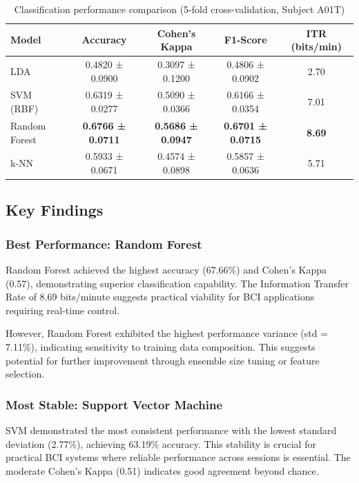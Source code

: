 \documentclass[11pt]{article}
\begin{document}
\begin{table}[H]
\centering
\caption{Classification performance comparison (5-fold cross-validation, Subject A01T)}
\label{tab:performance}
\begin{tabular}{@{}lcccc@{}}
\toprule
\textbf{Model} & \textbf{Accuracy} & \textbf{Cohen's Kappa} & \textbf{F1-Score} & \textbf{ITR (bits/min)} \\
\midrule
LDA & 0.4820 ± 0.0900 & 0.3097 ± 0.1200 & 0.4806 ± 0.0902 & 2.70 \\
SVM (RBF) & 0.6319 ± 0.0277 & 0.5090 ± 0.0366 & 0.6166 ± 0.0354 & 7.01 \\
Random Forest & \textbf{0.6766 ± 0.0711} & \textbf{0.5686 ± 0.0947} & \textbf{0.6701 ± 0.0715} & \textbf{8.69} \\
k-NN & 0.5933 ± 0.0671 & 0.4574 ± 0.0898 & 0.5857 ± 0.0636 & 5.71 \\
\bottomrule
\end{tabular}
\end{table}

\subsection{Key Findings}

\subsubsection{Best Performance: Random Forest}

Random Forest achieved the highest accuracy (67.66\%) and Cohen's Kappa (0.57), demonstrating superior classification capability. The Information Transfer Rate of 8.69 bits/minute suggests practical viability for BCI applications requiring real-time control.

However, Random Forest exhibited the highest performance variance (std = 7.11\%), indicating sensitivity to training data composition. This suggests potential for further improvement through ensemble size tuning or feature selection.

\subsubsection{Most Stable: Support Vector Machine}

SVM demonstrated the most consistent performance with the lowest standard deviation (2.77\%), achieving 63.19\% accuracy. This stability is crucial for practical BCI systems where reliable performance across sessions is essential. The moderate Cohen's Kappa (0.51) indicates good agreement beyond chance.
\end{document}
